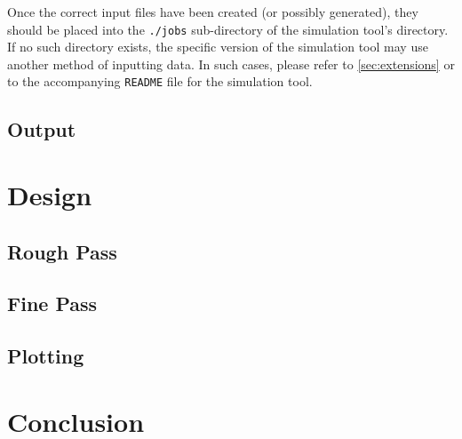 \documentclass[12pt,letterpaper]{article}
\begin{document}
Once the correct input files have been created (or possibly generated), they
should be placed into the {\tt ./jobs} sub-directory of the simulation tool's
directory. If no such directory exists, the specific version of the simulation
tool may use another method of inputting data. In such cases, please refer to
\autoref{sec:extensions} or to the accompanying {\tt README} file for the
simulation tool.

\subsection{Output}
\label{sec:usage:output}

%
%
\section{Design}
\label{sec:design}

\subsection{Rough Pass}
\label{sec:design:rough}

\subsection{Fine Pass}
\label{sec:design:fine}

\subsection{Plotting}
\label{sec:design:plotting}

%
%
\section{Conclusion}
\label{sec:conclusion}

%
%
\newpage
\renewcommand{\bibname}{References}


\end{document}
